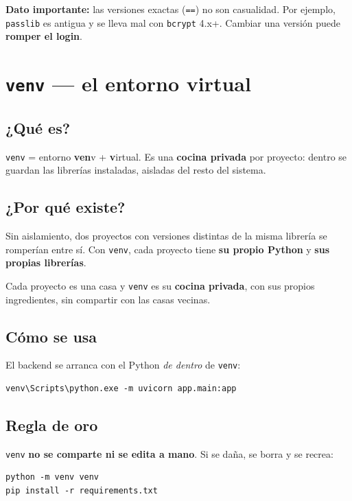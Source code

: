 \documentclass[11pt,a4paper]{article}
\begin{document}
\textbf{Dato importante:} las versiones exactas (\texttt{==}) no son casualidad.
Por ejemplo, \texttt{passlib} es antigua y se lleva mal con \texttt{bcrypt} 4.x+.
Cambiar una versión puede \textbf{romper el login}.

\section{\texttt{venv} --- el entorno virtual}

\subsection{¿Qué es?}

\texttt{venv} = entorno \textbf{ven}v + \textbf{v}irtual. Es una \textbf{cocina privada}
por proyecto: dentro se guardan las librerías instaladas, aisladas del resto del sistema.

\subsection{¿Por qué existe?}

Sin aislamiento, dos proyectos con versiones distintas de la misma librería se romperían
entre sí. Con \texttt{venv}, cada proyecto tiene \textbf{su propio Python} y \textbf{sus propias librerías}.

\begin{analogia}
Cada proyecto es una casa y \texttt{venv} es su \textbf{cocina privada}, con sus propios
ingredientes, sin compartir con las casas vecinas.
\end{analogia}

\subsection{Cómo se usa}

El backend se arranca con el Python \emph{de dentro} de \texttt{venv}:

\begin{lstlisting}
venv\Scripts\python.exe -m uvicorn app.main:app
\end{lstlisting}

\subsection{Regla de oro}

\begin{recuadro}
\texttt{venv} \textbf{no se comparte ni se edita a mano}. Si se daña, se borra y se recrea:
\begin{lstlisting}
python -m venv venv
pip install -r requirements.txt
\end{lstlisting}
\end{recuadro}
\end{document}
